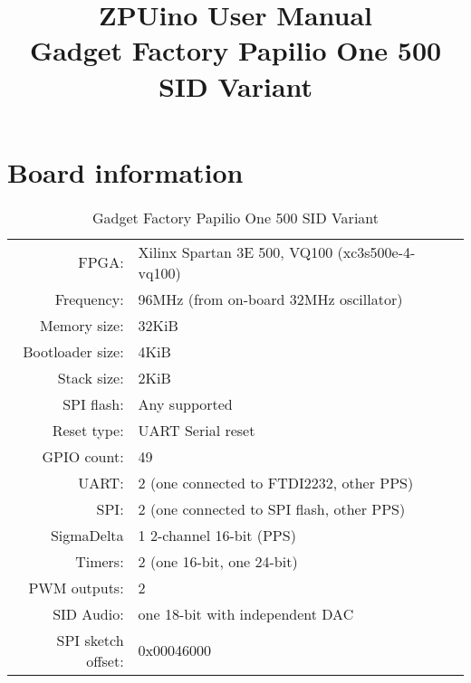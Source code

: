 \documentclass[12pt,a4paper,openany,smallheadings,headinclude,headsepline,final]{scrreprt}
\def \board {Gadget Factory Papilio One 500 SID Variant }
\begin{document}

\parindent 0cm
\parskip 0.2cm

\title{ZPUino User Manual\\ \board }
\maketitle

\tableofcontents
\clearpage

\chapter{Board information}

\begin{table}[H]
\begin{center}
\begin{tabularx}{14cm}{rX}
FPGA:              & Xilinx Spartan 3E 500, VQ100 (xc3s500e-4-vq100)\\
Frequency:         & 96MHz (from on-board 32MHz oscillator)\\
Memory size:       & 32KiB \\
Bootloader size:   & 4KiB \\
Stack size:        & 2KiB \\
SPI flash:         & Any supported \\
Reset type:        & UART Serial reset \\
GPIO count:        & 49 \\
UART:              & 2 (one connected to FTDI2232, other PPS) \\
SPI:               & 2 (one connected to SPI flash, other PPS) \\
SigmaDelta         & 1 2-channel 16-bit (PPS) \\
Timers:            & 2 (one 16-bit, one 24-bit) \\
PWM outputs:       & 2     \\
SID Audio:         & one 18-bit with independent DAC \\
SPI sketch offset: & 0x00046000
\end{tabularx}
\caption{\board}
\end{center}
\end{table}
\end{document}
